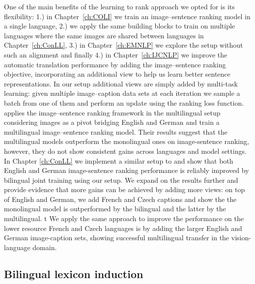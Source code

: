 One of the main benefits of the learning to rank approach we opted for is
its flexibility: 1.) in Chapter~\ref{ch:COLI} we train an image--sentence ranking model in a single 
language, 2.) we apply the same building blocks to train on multiple languages where 
the same images are shared between languages in Chapter~\ref{ch:ConLL}, 3.) in 
Chapter~\ref{ch:EMNLP} we explore the setup without such an alignment and finally 4.) 
in Chapter~\ref{ch:IJCNLP} we improve the automatic translation  performance 
by adding the image--sentence ranking objective, incorporating an additional view 
to help us learn better sentence representations. In our setup additional views are simply 
added by multi-task learning: given multiple image--caption data sets at each iteration we sample 
a batch from one of them and perform an update using the ranking loss function.
\citep{gella2017image} applies the image--sentence ranking framework in the multilingual setup
considering images as a pivot bridging English and German and train a multilingual
image--sentence ranking model.
Their results suggest that the multilingual models outperform the monolingual ones on image-sentence
ranking, however, they do not show consistent gains across languages and model settings.
In Chapter \ref{ch:ConLL} we implement a similar setup to \cite{gella2017image}
and  show that both English and German image-sentence
ranking performance is reliably improved by bilingual joint training using our setup.
We expand on the results further and provide evidence that more gains can be
achieved by adding more views: on top of English and German, we
add French and Czech captions and show the the monolingual model is outperformed by the bilingual
and the latter by the multilingual. 
t%
We apply the same approach to improve the performance on the lower resource
French and Czech languages is by adding the larger
English and German image-caption sets, showing successful multilingual
transfer in the vision-language domain.


\subsection{Bilingual lexicon induction}
\label{sec:bilinglex}

